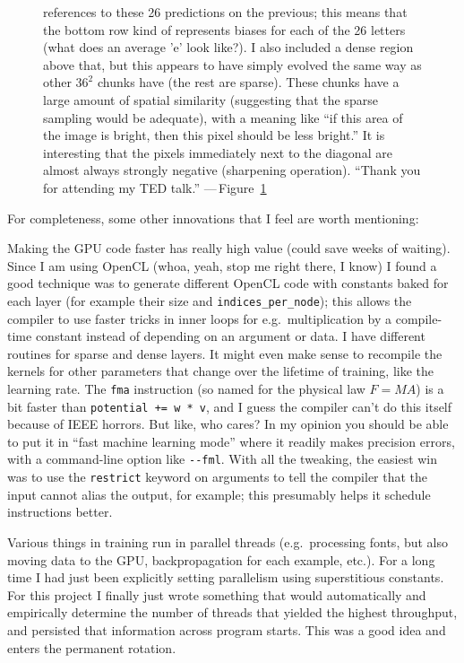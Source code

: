 \documentclass[twocolumn]{article}
\begin{document}
\begin{figure}[ht]
{    references to these 26 predictions on the previous; this means
    that the bottom row kind of represents biases for each of the 26
    letters (what does an average 'e' look like?). I also included a
    dense region above that, but this appears to have simply evolved
    the same way as other $36^2$ chunks have (the rest are sparse).
    These chunks have a large amount of spatial similarity (suggesting
    that the sparse sampling would be adequate), with a meaning like
    ``if this area of the image is bright, then this pixel should
    be less bright.'' It is interesting that the pixels immediately
    next to the diagonal are almost always strongly negative
    (sharpening operation). ``Thank you for attending my TED talk.''
    ---\,Figure~\ref{fig:lastlayer}}
  \label{fig:lastlayer}
\end{figure}

For completeness, some other innovations that I feel are worth
mentioning:

Making the GPU code faster has really high value (could save weeks of
waiting). Since I am using OpenCL (whoa, yeah, stop me right there, I
know) I found a good technique was to generate different OpenCL code with
constants baked for each layer (for example their size and
\verb+indices_per_node+); this allows the compiler to use faster
tricks in inner loops for e.g.~multiplication by a compile-time constant
instead of depending on an argument or data. I have different routines
for sparse and dense layers. It might even make sense to recompile the
kernels for other parameters that change over the lifetime of
training, like the learning rate. The {\tt fma} instruction (so named
for the physical law $F=MA$) is a bit faster than
\verb|potential += w * v|, and I guess the compiler can't do this
itself because of IEEE horrors. But like, who cares? In my opinion you
should be able to put it in ``fast machine learning mode'' where it
readily makes precision errors, with a command-line option like
\verb+--fml+. With all the tweaking, the easiest win was to use the
{\tt restrict} keyword on arguments to tell the compiler that the
input cannot alias the output, for example; this presumably helps
it schedule instructions better.

Various things in training run in parallel threads (e.g.~processing
fonts, but also moving data to the GPU, backpropagation for each
example, etc.). For a long time I had just been explicitly setting
parallelism using superstitious constants. For this project I finally
just wrote something that would automatically and empirically
determine the number of threads that yielded the highest throughput,
and persisted that information across program starts. This was a
good idea and enters the permanent rotation.
\end{document}
